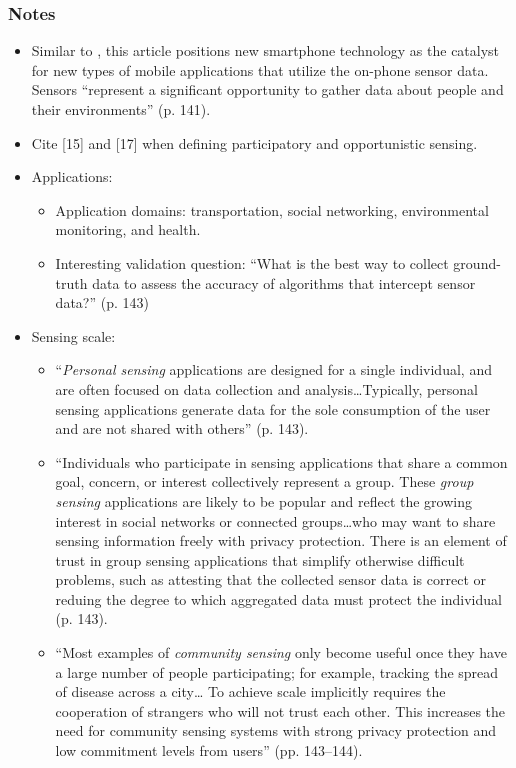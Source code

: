 \subsubsection*{Notes}
\begin{itemize}
\item Similar to \cite{Ganti2011}, this article positions new smartphone technology as the catalyst for new types of mobile applications that utilize the on-phone sensor data. Sensors ``represent a significant opportunity to gather data about people and their environments'' (p. 141).
\item Cite [15] and [17] when defining participatory and opportunistic sensing.
\item Applications:
	\begin{itemize}
		\item Application domains: transportation, social networking, environmental monitoring, and health.
		\item Interesting validation question: ``What is the best way to collect ground-truth data to assess the accuracy of algorithms that intercept sensor data?'' (p. 143)
	\end{itemize}
\item Sensing scale:
	\begin{itemize}
		\item ``\emph{Personal sensing} applications are designed for a single individual, and are often focused on data collection and analysis{\ldots}Typically, personal sensing applications generate data for the sole consumption of the user and are not shared with others'' (p. 143).
		\item ``Individuals who participate in sensing applications that share a common goal, concern, or interest collectively represent a group. These \emph{group sensing} applications are likely to be popular and reflect the growing interest in social networks or connected groups{\ldots}who may want to share sensing information freely with privacy protection. There is an element of trust in group sensing applications that simplify otherwise difficult problems, such as attesting that the collected sensor data is correct or reduing the degree to which aggregated data must protect the individual (p. 143).
		\item ``Most examples of \emph{community sensing} only become useful once they have a large number of people participating; for example, tracking the spread of disease across a city{\ldots} To achieve scale implicitly requires the cooperation of strangers who will not trust each other. This increases the need for community sensing systems with strong privacy protection and low commitment levels from users'' (pp. 143--144).

\end{itemize}
\end{itemize}
